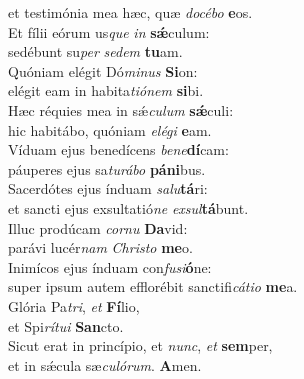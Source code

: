 \evenverse et testimónia mea hæc, quæ \textit{do}\textit{cé}\textit{bo} \textbf{e}os.\\
\oddverse Et fílii eórum us\textit{que} \textit{in} \textbf{sǽ}culum:~\*\\
\oddverse sedébunt su\textit{per} \textit{se}\textit{dem} \textbf{tu}am.\\
\evenverse Quóniam elégit Dó\textit{mi}\textit{nus} \textbf{Si}on:~\*\\
\evenverse elégit eam in habita\textit{ti}\textit{ó}\textit{nem} \textbf{si}bi.\\
\oddverse Hæc réquies mea in sǽ\textit{cu}\textit{lum} \textbf{sǽ}culi:~\*\\
\oddverse hic habitábo, quóniam \textit{e}\textit{lé}\textit{gi} \textbf{e}am.\\
\evenverse Víduam ejus benedícens \textit{be}\textit{ne}\textbf{dí}cam:~\*\\
\evenverse páuperes ejus sa\textit{tu}\textit{rá}\textit{bo} \textbf{pá}\textbf{ni}bus.\\
\oddverse Sacerdótes ejus índuam \textit{sa}\textit{lu}\textbf{tá}ri:~\*\\
\oddverse et sancti ejus exsultatió\textit{ne} \textit{ex}\textit{sul}\textbf{tá}bunt.\\
\evenverse Illuc prodúcam \textit{cor}\textit{nu} \textbf{Da}vid:~\*\\
\evenverse parávi lucér\textit{nam} \textit{Chri}\textit{sto} \textbf{me}o.\\
\oddverse Inimícos ejus índuam con\textit{fu}\textit{si}\textbf{ó}ne:~\*\\
\oddverse super ipsum autem efflorébit sanctifi\textit{cá}\textit{ti}\textit{o} \textbf{me}a.\\
\evenverse Glória Pa\textit{tri}, \textit{et} \textbf{Fí}lio,~\*\\
\evenverse et Spi\textit{rí}\textit{tu}\textit{i} \textbf{San}cto.\\
\oddverse Sicut erat in princípio, et \textit{nunc}, \textit{et} \textbf{sem}per,~\*\\
\oddverse et in sǽcula sæ\textit{cu}\textit{ló}\textit{rum}. \textbf{A}men.\\
